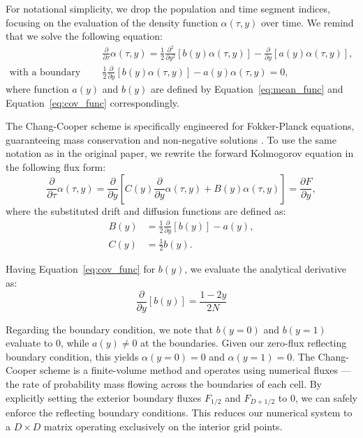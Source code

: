 \documentclass{article}
\begin{document}
For notational simplicity, we drop the population and time segment indices, focusing on the evaluation of the density function $\alpha(\tau, y)$ over time.
We remind that we solve the following equation:
\begin{equation*}
\begin{split}
&\frac{\partial}{\partial \tau}\alpha(\tau,y) = \frac{1}{2} \frac{\partial^2}{\partial y^2} \left[b(y)\alpha(\tau,y)\right] - \frac{\partial}{\partial y} \left[a(y)\alpha(\tau,y)\right], \\
\text{with a boundary condition: } & \frac{1}{2} \frac{\partial}{\partial y} \left[b(y)\alpha(\tau, y)\right] - a(y) \alpha(\tau,y) = 0,
\end{split}
\end{equation*}
where function $a(y)$ and $b(y)$ are defined by Equation~\ref{eq:mean_func} and Equation~\ref{eq:cov_func} correspondingly.

\bigskip

The Chang-Cooper scheme is specifically engineered for Fokker-Planck equations, guaranteeing mass conservation and non-negative solutions \citep{chang1970}.
To use the same notation as in the original paper, we rewrite the forward Kolmogorov equation in the following flux form:
$$
\frac{\partial}{\partial \tau}\alpha(\tau,y) = \frac{\partial}{\partial y} \left[ C(y) \frac{\partial}{\partial y} \alpha(\tau, y) + B(y) \alpha(\tau, y) \right] = \frac{\partial F}{\partial y},
$$
where the substituted drift and diffusion functions are defined as:
$$
\begin{aligned}
    B(y) &= \frac{1}{2} \frac{\partial}{\partial y}[b(y)] - a(y), \\
    C(y) &= \frac{1}{2} b(y).
\end{aligned}
$$

Having Equation~\ref{eq:cov_func} for $ b(y) $, we evaluate the analytical derivative as:
$$
\frac{\partial}{\partial y}[b(y)] = \frac{1 - 2y}{2N}
$$

Regarding the boundary condition, we note that $b(y=0)$ and $b(y=1)$ evaluate to 0, while $a(y) \neq 0$ at the boundaries.
Given our zero-flux reflecting boundary condition, this yields $\alpha(y=0) = 0$ and $\alpha(y=1) = 0$.
The Chang-Cooper scheme is a finite-volume method and operates using numerical fluxes --- the rate of probability mass flowing across the boundaries of each cell.
By explicitly setting the exterior boundary fluxes $F_{1/2}$ and $F_{D+1/2}$ to 0, we can safely enforce the reflecting boundary conditions.
This reduces our numerical system to a $D \times D$ matrix operating exclusively on the interior grid points.
\end{document}
